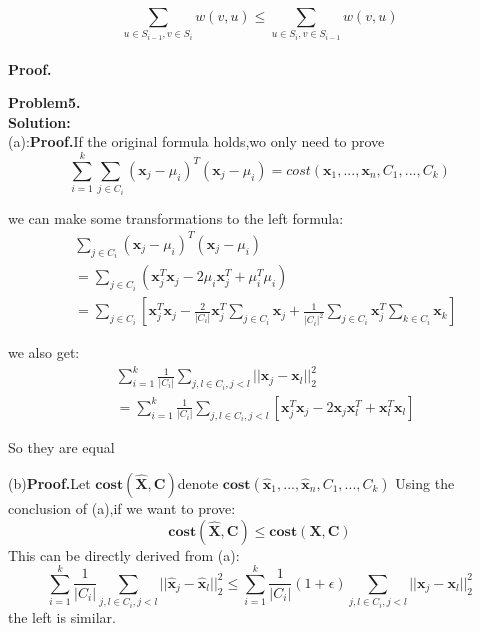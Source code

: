 \documentclass{article}
\begin{document}
$$\sum\limits_{u \in S_{i-1}, v \in S_{i}}w(v,u) \leq \sum\limits_{u \in S_{i}, v \in S_{i-1}}w(v,u) $$ \\
\textbf{Proof.}

\newpage \noindent\textbf{Problem5.}\\
\textbf{Solution:}\\

(a):\textbf{Proof.}If the original formula holds,wo only need to prove
$$\sum_{i=1}^k\sum_{j \in C_i}(\textbf{x}_j - \mu_i)^T(\textbf{x}_j-\mu_i) = cost(\textbf{x}_1,...,\textbf{x}_n,C_1,...,C_k)$$

we can make some transformations to the left formula:\\
$$\begin{aligned}
    &\sum_{j \in C_i}(\textbf{x}_j - \mu_i)^T(\textbf{x}_j-\mu_i)\\
    &=\sum_{j \in C_i}(\textbf{x}_j^T\textbf{x}_j-2\mu_i\textbf{x}_j^T + \mu_i^T\mu_i)\\
    &=\sum_{j \in C_i}[\textbf{x}_j^T\textbf{x}_j - \frac{2}{|C_i|}\textbf{x}_j^T\sum_{j \in C_i}\textbf{x}_j+\frac{1}{|C_i|^2}\sum_{j \in C_i}\textbf{x}_j^T\sum_{k \in C_i}\textbf{x}_k]  
\end{aligned}$$

we also get:\\$$
\begin{aligned}
    &\sum_{i=1}^k\frac{1}{|C_i|}\sum_{j,l\in C_i,j<l}||\textbf{x}_j-\textbf{x}_l||^2_2\\
    &=\sum_{i=1}^k\frac{1}{|C_i|}\sum_{j,l\in C_i,j<l}[\textbf{x}_j^T\textbf{x}_j-2\textbf{x}_j\textbf{x}_l^T + \textbf{x}_l^T\textbf{x}_l]
\end{aligned}$$

So they are equal

(b)\textbf{Proof.}Let $\textbf{cost}(\hat{\textbf{X}},\textbf{C})$denote $\textbf{cost}(\hat{\textbf{x}}_1,...,\hat{\textbf{x}}_n,C_1,...,C_k) $ 
Using the conclusion of (a),if we want to prove:
$$\textbf{cost}(\hat{\textbf{X}},\textbf{C}) \leq \textbf{cost}(\textbf{X},\textbf{C})$$
This can be directly derived from (a):$$\sum_{i=1}^k\frac{1}{|C_i|}\sum_{j,l\in C_i,j<l}||\hat{\textbf{x}}_j-\hat{\textbf{x}}_l||_2^2 \leq 
\sum_{i=1}^k\frac{1}{|C_i|}(1+\epsilon)\sum_{j,l\in C_i,j<l}||\textbf{x}_j-\textbf{x}_l||_2^2$$
the left is similar.
\end{document}
